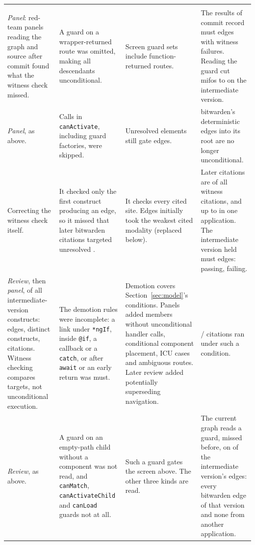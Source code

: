 \begin{xltabular}{\textwidth}{@{}YYYY@{}}
\addlinespace
{} \\
\emph{Panel}: red-team panels reading the graph and source after commit \EarlierCommit{} found what the witness check missed.
  & A guard on a wrapper-returned route was omitted, making all descendants unconditional.
  & Screen guard sets include function-returned routes.
  & The results of commit \EarlierCommit{} record \EarlierMustEdges{} must edges with \EarlierMustViolations{} witness failures. Reading the guard cut mifos to \RoundMustEdgesMifos{} on the intermediate version. \\
\emph{Panel}, as above.
  & Calls in \texttt{canActivate}, including guard factories, were skipped.
  & Unresolved elements still gate edges.
  & bitwarden's deterministic edges into its root are no longer unconditional. \\
Correcting the witness check itself.
  & It checked only the first construct producing an edge, so it missed that later bitwarden citations targeted unresolved .
  & It checks every cited site. Edges initially took the weakest cited modality (replaced below).
  & Later citations are \WitnessMergedCitationShareAll{} of all witness citations, and up to \WitnessMergedCitationShareMax{} in one application. The intermediate version held \RoundMustEdges{} must edges: \RoundMustClean{} passing, \RoundMustViolations{} failing. \\
\emph{Review}, then \emph{panel}, of all intermediate-version constructs: \MustCtxEdges{} edges, \MustCtxDistinct{} distinct constructs, \MustCtxConstructs{} citations. Witness checking compares targets, not unconditional execution.
  & The demotion rules were incomplete: a link under \texttt{*ngIf}, inside \texttt{@if}, a callback or a \texttt{catch}, or after \texttt{await} or an early return was must.
  & Demotion covers Section~\ref{sec:model}'s conditions. Panels added members without unconditional handler calls, conditional component placement, ICU cases and ambiguous routes. Later review added potentially superseding navigation.
  & \MustCtxConditional{}/\MustCtxConstructs{} citations ran under such a condition. \\
\emph{Review}, as above.
  & A guard on an empty-path child without a component was not read, and \texttt{canMatch}, \texttt{canActivateChild} and \texttt{canLoad} guards not at all.
  & Such a guard gates the screen above. The other three kinds are read.
  & The current graph reads a guard, missed before, on \MustFateGuard{} of the intermediate version's edges: every bitwarden edge of that version and none from another application. \\

\end{xltabular}
